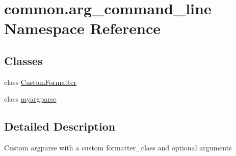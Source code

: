 \hypertarget{namespacecommon_1_1arg__command__line}{}\section{common.\+arg\+\_\+command\+\_\+line Namespace Reference}
\label{namespacecommon_1_1arg__command__line}
\subsection*{Classes}
\begin{DoxyCompactItemize}
\item 
class \hyperlink{classcommon_1_1arg__command__line_1_1_custom_formatter}{Custom\+Formatter}
\item 
class \hyperlink{classcommon_1_1arg__command__line_1_1myargparse}{myargparse}
\end{DoxyCompactItemize}


\subsection{Detailed Description}
\begin{DoxyVerb}Custom argparse with a custom formatter_class and optional arguments
\end{DoxyVerb}
 